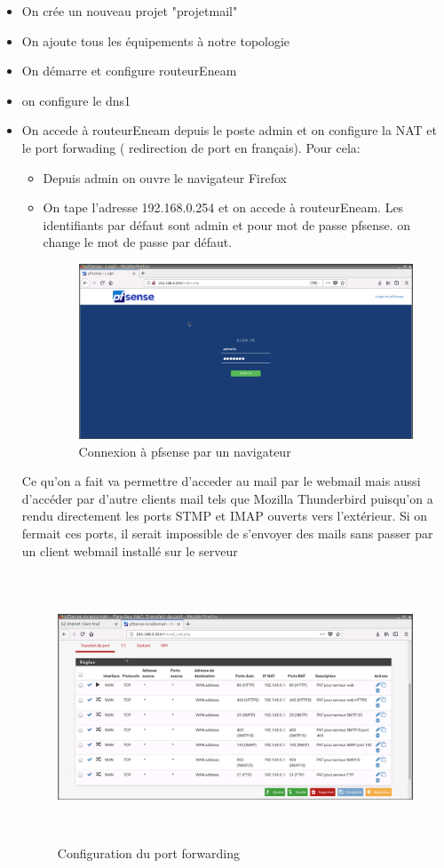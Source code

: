 \documentclass[a4paper,12pt,french]{report} %
\begin{document}
\begin{itemize}
\item On crée un nouveau projet "projetmail"
\item On ajoute tous les équipements à notre topologie
\item On démarre et configure routeurEneam
\item on configure le dns1
\item On accede à routeurEneam depuis le poste admin et on configure la NAT et le port forwading ( redirection de port en français). Pour cela:
	\begin{itemize}
	\item Depuis admin on ouvre le navigateur Firefox
	\item On tape l'adresse 192.168.0.254 et on accede à routeurEneam. Les identifiants par défaut sont admin et pour mot de passe pfsense. on change le mot de passe par défaut.
	\begin{figure}[H]
	\centering
	\includegraphics[scale=0.4]{figure/pfsense_login.png}
	\caption{Connexion à pfsense par un navigateur}	
	\end{figure}	 	
	\end{itemize}
	Ce qu'on a fait va permettre d'acceder au mail par le webmail mais aussi d'accéder par d'autre clients mail tels que Mozilla Thunderbird puisqu'on a rendu directement les ports STMP et IMAP ouverts vers l'extérieur. Si on fermait ces ports, il serait impossible de s'envoyer des mails sans passer par un client webmail installé sur le serveur
\begin{figure}[H]
\centering
\includegraphics[width=14cm, height=8cm]{figure/figure_routeurMail_configuration_pat.png}
\caption{Configuration du port forwarding}
\label{Configuration du PAT}
\end{figure}
\end{itemize}
\end{document}

